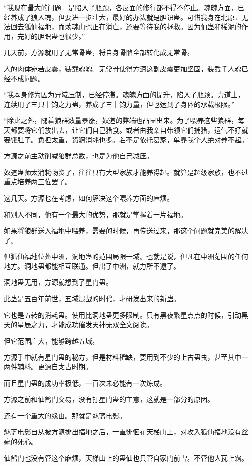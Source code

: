 \begin{this_body}
“我现在最大的问题，是陷入了瓶颈，各反面的修行都不得不停止。魂魄方面，已经养成了狼人魂，但要进一步壮大，最好的办法就是胆识蛊。可惜我身在北原，无法回去狐仙福地，而荡魂山也正在消亡，还要等待我的拯救。因为仙蛊和稀泥的作用，完好的胆识蛊也很少。”

几天前，方源就用了无常骨蛊，将自身骨骼全部转化成无常骨。

人的肉体宛若皮囊，装载魂魄。无常骨使得方源这副皮囊更加坚固，装载千人魂已经不成问题。

“我本身修为因为异域压制，已经停滞。魂魄方面的提升，陷入了瓶颈。力道上，连续用了三只十钧之力蛊，养成了三十钧力量，但也达到了身体的承载极限。”

“除此之外，随着狼群数量暴涨，奴道的弊端也凸显出来。为了喂养这些狼群，每天都要将它们放出去，让它们自己猎食。或者由我亲自带领它们捕猎，运气不好就要饿肚子。负担太重，资源消耗也多。若不是依托葛家，单靠我个人绝对养不起。”

方源之前主动削减狼群总数，也是为他自己减压。

奴道蛊师太消耗物资了，往往只有大型家族才能养得起。就算是超级家族，也不过重点培养两三位罢了。

这几天。方源也在考虑，如何解决这个喂养方面的麻烦。

和别人不同，他有一个最大的优势，那就是掌握着一片福地。

如果将狼群送入福地中喂养，需要的时候，再传送过来，那这个问题就完美的解决了。

但狐仙福地位处中洲，洞地蛊的范围局限一域。也就是说，但凡在中洲范围的任何地方。洞地蛊都能相互联通。但出了中洲，就力所不逮了。

洞地蛊无用，方源就想到了星门蛊。

此蛊是五百年前世，五域混战的时代，才研发出来的新蛊。

它也是五转的消耗蛊。使用比洞地蛊更多限制。只有黑夜繁星点点的时候，引动黑天的星辰之力，才能成功催发天神无双全文阅读。

但它范围广大，能够跨越五域。

方源手中就有星门蛊的秘方，但是材料稀缺，要用到不少的上古蛊虫，甚至其中一两件辅料。更源自太古时期。

而且星门蛊的成功率极低，一百次未必能有一次炼成。

方源之前和仙鹤门交易，没有打星门蛊的主意，这就是一部分的原因。

还有一个重大的缘由。那就是魅蓝电影。

魅蓝电影自从被方源排出福地之后，一直徘徊在天梯山上，对攻入狐仙福地没有丝毫的死心。

仙鹤门也没有管这个麻烦，天梯山上的蛊仙也只管自家门前雪。不管他人瓦上霜。


\end{this_body}
